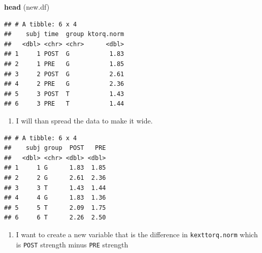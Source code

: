 \documentclass[
]{book}
\newenvironment{Shaded}{\begin{snugshade}}{\end{snugshade}}
\newcommand{\DataTypeTok}[1]{\textcolor[rgb]{0.13,0.29,0.53}{#1}}
\newcommand{\KeywordTok}[1]{\textcolor[rgb]{0.13,0.29,0.53}{\textbf{#1}}}
\newcommand{\NormalTok}[1]{#1}
\newcommand{\OperatorTok}[1]{\textcolor[rgb]{0.81,0.36,0.00}{\textbf{#1}}}
\newcommand{\StringTok}[1]{\textcolor[rgb]{0.31,0.60,0.02}{#1}}
\providecommand{\tightlist}{%
  \setlength{\itemsep}{0pt}\setlength{\parskip}{0pt}}
\begin{document}
\begin{Shaded}
\begin{Highlighting}[]
\KeywordTok{head}\NormalTok{ (new.df)}
\end{Highlighting}
\end{Shaded}

\begin{verbatim}
## # A tibble: 6 x 4
##    subj time  group ktorq.norm
##   <dbl> <chr> <chr>      <dbl>
## 1     1 POST  G           1.83
## 2     1 PRE   G           1.85
## 3     2 POST  G           2.61
## 4     2 PRE   G           2.36
## 5     3 POST  T           1.43
## 6     3 PRE   T           1.44
\end{verbatim}

\begin{enumerate}
\def\labelenumi{\arabic{enumi}.}
\setcounter{enumi}{5}
\tightlist
\item
  I will than spread the data to make it wide.
\end{enumerate}

\begin{Shaded}
\end{Shaded}

\begin{verbatim}
## # A tibble: 6 x 4
##    subj group  POST   PRE
##   <dbl> <chr> <dbl> <dbl>
## 1     1 G      1.83  1.85
## 2     2 G      2.61  2.36
## 3     3 T      1.43  1.44
## 4     4 G      1.83  1.36
## 5     5 T      2.09  1.75
## 6     6 T      2.26  2.50
\end{verbatim}

\begin{enumerate}
\def\labelenumi{\arabic{enumi}.}
\setcounter{enumi}{6}
\tightlist
\item
  I want to create a new variable that is the difference in \texttt{kexttorq.norm} which is \texttt{POST} strength minus \texttt{PRE} strength
\end{enumerate}

\begin{Shaded}
\end{Shaded}
\end{document}
